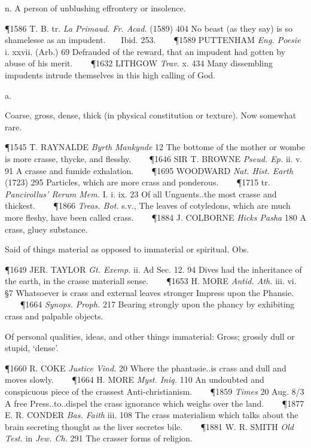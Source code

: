 \begin{description}[wide, labelwidth=!, labelindent=0pt]
\begin{myenumerate}
 n. A person of unblushing effrontery or insolence.

\P 1586 T. B. tr.  \textit{La Primaud. Fr. Acad.} (1589) 404 No beast (as they say) is so shamelesse as an impudent.    Ibid. 253.    
\P 1589 PUTTENHAM  \textit{Eng. Poesie} i. xxvii. (Arb.) 69 Defrauded of the reward, that an impudent had gotten by abuse of his merit.    
\P 1632 LITHGOW  \textit{Trav.} x. 434 Many dissembling impudents intrude themselves in this high calling of God.
\end{myenumerate}


 a.

\noindent {}

\vspace{-0.3cm}

\begin{myenumerate}

 Coarse, gross, dense, thick (in physical constitution or texture). Now somewhat rare.

\P 1545 T. RAYNALDE  \textit{Byrth Mankynde} 12 The bottome of the mother or wombe is more crasse, thycke, and flesshy.    
\P 1646 SIR T. BROWNE  \textit{Pseud. Ep.} ii. v. 91 A crasse and fumide exhalation.    
\P 1695 WOODWARD  \textit{Nat. Hist. Earth} (1723) 295 Particles, which are more crass and ponderous.    
\P 1715 tr.  \textit{Pancirollus' Rerum Mem.} I. i. ix. 23 Of all Unguents..the most crasse and thickest.    
\P 1866 \textit{Treas.  Bot.} s.v., The leaves of cotyledons, which are much more fleshy, have been called crass.    
\P 1884 J. COLBORNE  \textit{Hicks Pasha} 180 A crass, gluey substance.

 Said of things material as opposed to immaterial or spiritual. Obs.

\P 1649 JER. TAYLOR  \textit{Gt. Exemp.} ii. Ad Sec. 12. 94 Dives had the inheritance of the earth, in the crasse materiall sense.    
\P 1653 H. MORE  \textit{Antid. Ath.} iii. vi. §7 Whatsoever is crass and external leaves stronger Impress upon the Phansie.    
\P 1664  \textit{ Synops. Proph.} 217 Bearing strongly upon the phancy by exhibiting crass and palpable objects.

 Of personal qualities, ideas, and other things immaterial: Gross; grossly dull or stupid, ‘dense’.

\P 1660 R. COKE  \textit{Justice Vind.} 20 Where the phantasie..is crass and dull and moves slowly.    
\P 1664 H. MORE  \textit{Myst. Iniq.} 110 An undoubted and conspicuous piece of the crassest Anti-christianism.    
\P 1859  \textit{Times} 20 Aug. 8/3 A free Press..to..dispel the crass ignorance which weighs over the land.    
\P 1877 E. R. CONDER  \textit{Bas. Faith} iii. 108 The crass materialism which talks about the brain secreting thought as the liver secretes bile.    
\P 1881 W. R. SMITH  \textit{Old Test.} in \textit{Jew. Ch.} 291 The crasser forms of religion.


\end{myenumerate}
\end{description}
